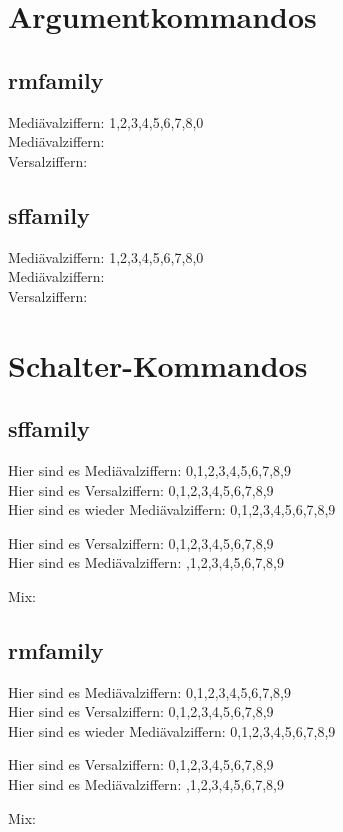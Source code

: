 \documentclass[a4paper,11pt,parskip=full]{tubsartcl}
\title{}
\author{}
\begin{document}
\large

\section*{Argumentkommandos}
\subsection*{rmfamily}
\rmfamily
Mediävalziffern: 1,2,3,4,5,6,7,8,0\\
Mediävalziffern: \\
Versalziffern: 

\subsection*{sffamily}
\sffamily
Mediävalziffern: 1,2,3,4,5,6,7,8,0\\
Mediävalziffern: \\
Versalziffern: 


\section*{Schalter-Kommandos}
\subsection*{sffamily}


{ Hier sind es Mediävalziffern: 0,1,2,3,4,5,6,7,8,9\\}
{ Hier sind es Versalziffern: 0,1,2,3,4,5,6,7,8,9\\}
Hier sind es wieder Mediävalziffern: 0,1,2,3,4,5,6,7,8,9

{ Hier sind es Versalziffern: 0,1,2,3,4,5,6,7,8,9\\}
{ Hier sind es Mediävalziffern: ,1,2,3,4,5,6,7,8,9}

Mix: 

\subsection*{rmfamily}


{ Hier sind es Mediävalziffern: 0,1,2,3,4,5,6,7,8,9\\}
{ Hier sind es Versalziffern: 0,1,2,3,4,5,6,7,8,9\\}
Hier sind es wieder Mediävalziffern: 0,1,2,3,4,5,6,7,8,9

{ Hier sind es Versalziffern: 0,1,2,3,4,5,6,7,8,9\\}
{ Hier sind es Mediävalziffern: ,1,2,3,4,5,6,7,8,9}

Mix: 
\end{document}
